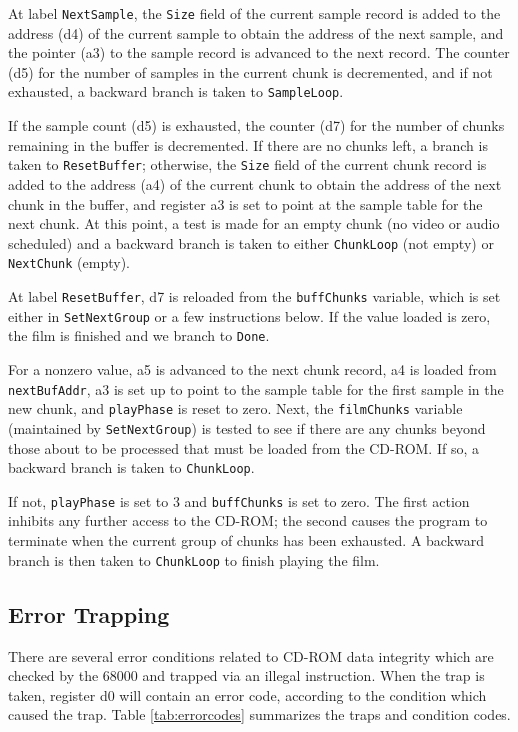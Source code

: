 \documentclass[12pt,letterpaper,twoside]{article}
\begin{document}
At label \texttt{NextSample}, the \texttt{Size} field of the current sample record is added to the address (d4) of the current sample to obtain the address of the next sample, and the pointer (a3) to the sample record is advanced to the next record. The counter (d5) for the number of samples in the current chunk is decremented, and if not exhausted, a backward branch is taken to \texttt{SampleLoop}.

If the sample count (d5) is exhausted, the counter (d7) for the number of chunks remaining in the buffer is decremented. If there are no chunks left, a branch is taken to \texttt{ResetBuffer}; otherwise, the \texttt{Size} field of the current chunk record is added to the address (a4) of the current chunk to obtain the address of the next chunk in the buffer, and register a3 is set to point at the sample table for the next chunk. At this point, a test is made for an empty chunk (no video or audio scheduled) and a backward branch is taken to either \texttt{ChunkLoop} (not empty) or \texttt{NextChunk} (empty).

At label \texttt{ResetBuffer}, d7 is reloaded from the \texttt{buffChunks} variable, which is set either in \texttt{SetNextGroup} or a few instructions below. If the value loaded is zero, the film is finished and we branch to \texttt{Done}.

For a nonzero value, a5 is advanced to the next chunk record, a4 is loaded from \texttt{nextBufAddr}, a3 is set up to point to the sample table for the first sample in the new chunk, and \texttt{playPhase} is reset to zero. Next, the \texttt{filmChunks} variable (maintained by \texttt{SetNextGroup}) is tested to see if there are any chunks beyond those about to be processed that must be loaded from the CD-ROM. If so, a backward branch is taken to \texttt{ChunkLoop}.

If not, \texttt{playPhase} is set to 3 and \texttt{buffChunks} is set to zero. The first action inhibits any further access to the CD-ROM; the second causes the program to terminate when the current group of chunks has been exhausted. A backward branch is then taken to \texttt{ChunkLoop} to finish playing the film.

\subsection{Error Trapping}
There are several error conditions related to CD-ROM data integrity which are checked by the 68000 and trapped via an illegal instruction. When the trap is taken, register d0 will contain an error code, according to the condition which caused the trap. Table \ref{tab:errorcodes} summarizes the traps and condition codes.
\end{document}
